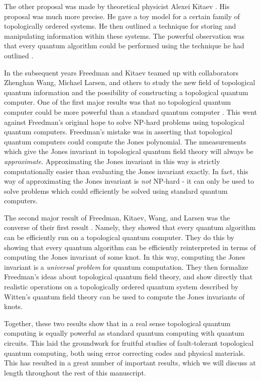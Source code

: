 \documentclass{article}
\theoremstyle{definition}
\numberwithin{figure}{section}
\begin{document}
The other proposal was made by theoretical physicist Alexei Kitaev \cite{kitaev2003fault}. His proposal was much more precise. He gave a toy model for a certain family of topologically ordered systems. He then outlined a technique for storing and manipulating information within these systems. The powerful observation was that every quantum algorithm could be performed using the technique he had outlined \cite{mochon2003anyons}.

In the subsequent years Freedman and Kitaev teamed up with collaborators Zhenghan Wang, Michael Larsen, and others to study the new field of topological quantum information and the possibility of constructing a topological quantum computer. One of the first major results was that no topological quantum computer could be more powerful than a standard quantum computer \cite{freedman2002simulation}. This went against Freedman’s original hope to solve NP-hard problems using topological quantum computers. Freedman’s mistake was in asserting that topological quantum computers could compute the Jones polynomial. The nmeasurements which give the Jones invariant in topological quantum field theory will always be \textit{approximate}. Approximating the Jones invariant in this way is strictly computationally easier than evaluating the Jones invariant exactly. In fact, this way of approximating the Jones invariant is \textit{not} NP-hard - it can only be used to solve problems which could efficiently be solved using standard quantum computers.

The second major result of Freedman, Kitaev, Wang, and Larsen was the converse of their first result \cite{freedman2002modular}. Namely, they showed that every quantum algorithm can be efficiently run on a topological quantum computer. They do this by showing that every quantum algorithm can be efficiently reinterpreted in terms of computing the Jones invariant of some knot. In this way, computing the Jones invariant is a \textit{universal problem} for quantum computation. They then formalize Freedman’s ideas about topological quantum field theory, and show directly that realistic operations on a topologically ordered quantum system described by Witten’s quantum field theory can be used to compute the Jones invariants of knots.

Together, these two results show that in a real sense topological quantum computing is equally powerful as standard quantum computing with quantum circuits. This laid the groundwork for fruitful studies of fault-tolerant topological quantum computing, both using error correcting codes and physical materials. This has resulted in a great number of important results, which we will discuss at length throughout the rest of this manuscript.
\end{document}
